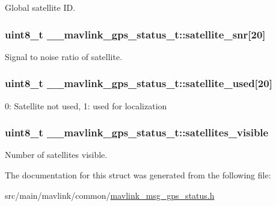 Global satellite I\+D. 

\hypertarget{struct____mavlink__gps__status__t_ab2fd8b1564a9ff56248448f6744f6f0e}{
\subsubsection[{satellite\+\_\+snr}]{\setlength{\rightskip}{0pt plus 5cm}uint8\+\_\+t \+\_\+\+\_\+mavlink\+\_\+gps\+\_\+status\+\_\+t\+::satellite\+\_\+snr\mbox{[}20\mbox{]}}}\label{struct____mavlink__gps__status__t_ab2fd8b1564a9ff56248448f6744f6f0e}


Signal to noise ratio of satellite. 

\hypertarget{struct____mavlink__gps__status__t_a84d55d0f78f60eecf76ee27767a80695}{
\subsubsection[{satellite\+\_\+used}]{\setlength{\rightskip}{0pt plus 5cm}uint8\+\_\+t \+\_\+\+\_\+mavlink\+\_\+gps\+\_\+status\+\_\+t\+::satellite\+\_\+used\mbox{[}20\mbox{]}}}\label{struct____mavlink__gps__status__t_a84d55d0f78f60eecf76ee27767a80695}


0\+: Satellite not used, 1\+: used for localization 

\hypertarget{struct____mavlink__gps__status__t_aaf907a0b7ca1bf692b59b3c07269a72d}{
\subsubsection[{satellites\+\_\+visible}]{\setlength{\rightskip}{0pt plus 5cm}uint8\+\_\+t \+\_\+\+\_\+mavlink\+\_\+gps\+\_\+status\+\_\+t\+::satellites\+\_\+visible}}\label{struct____mavlink__gps__status__t_aaf907a0b7ca1bf692b59b3c07269a72d}


Number of satellites visible. 



The documentation for this struct was generated from the following file\+:\begin{DoxyCompactItemize}
\item 
src/main/mavlink/common/\hyperlink{mavlink__msg__gps__status_8h}{mavlink\+\_\+msg\+\_\+gps\+\_\+status.\+h}\end{DoxyCompactItemize}
